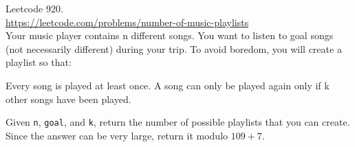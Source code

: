   Leetcode 920.\\
  \url{https://leetcode.com/problems/number-of-music-playlists}\\
  Your music player contains n different songs.
  You want to listen to goal songs (not necessarily different) during your trip.
  To avoid boredom, you will create a playlist so that:
  \begin{enumerate}[nosep]
    \li Every song is played at least once.
    \li A song can only be played again only if k other songs have been played.
  \end{enumerate}
  Given \verb!n!, \verb!goal!, and \verb!k!,
  return the number of possible playlists that you can create.
  Since the answer can be very large, return it modulo $109 + 7$.
